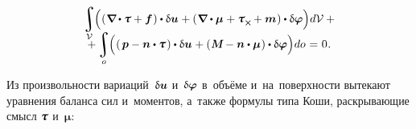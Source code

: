 \begin{otherlanguage}{russian}
\nopagebreak\vspace{-0.33em}
\begin{multline*}\label{virtualworkprinciple.2:micropolarcontinuum}
\integral\displaylimits_{\mathcal{V}} \hspace{-0.64ex} \left(^{\mathstrut} ( \hspace{.12ex} \boldnabla \hspace{-0.1ex} \dotp \mathboldtau + \bm{f} \hspace{.12ex} ) \dotp \variation{\fieldofdisplacements} \hspace{.1ex}
+ ( \hspace{.12ex} \boldnabla \dotp \bm{\mu} \hspace{.1ex} + \mathboldtau_{\Xcompanion} \hspace{-0.1ex} + \bm{m} \hspace{.1ex} ) \dotp \variation{\fieldofrotations} \right) \hspace{-0.32ex} d\mathcal{V} \hspace{0.5ex} + \\[-1.1em]
+ \integral\displaylimits_o \hspace{-0.64ex} \left(^{\mathstrut} ( \hspace{.32ex} \bm{p} - \bm{n} \dotp \mathboldtau \hspace{.2ex} ) \dotp \variation{\fieldofdisplacements} \hspace{.1ex}
+ ( \hspace{.1ex} \mathboldM - \bm{n} \dotp \bm{\mu} \hspace{.1ex} ) \dotp \variation{\fieldofrotations} \right) \hspace{-0.32ex} do \hspace{0.12ex} = \hspace{0.1ex} 0 \hspace{0.1ex}.
\end{multline*}

Из произвольности вариаций~$\updelta\hspace{-0.1ex}\bm{u}$ и~$\updelta\hspace{-0.1ex}\bm{\varphi}$ в~объёме и~на~поверхности вытекают уравнения баланса сил и~моментов, а~также формулы типа Коши, %
раскрывающие смысл $\mathboldtau$ и~$\bm{\mu}$:


\end{otherlanguage}
